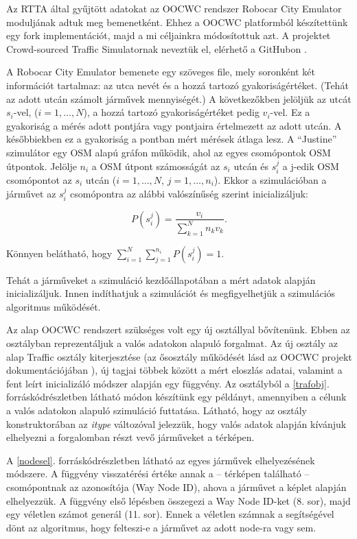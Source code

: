 \documentclass[a4paper,12pt]{report}
\begin{document}
Az RTTA által gyűjtött adatokat az OOCWC rendszer Robocar City Emulator moduljának adtuk meg bemenetként. Ehhez a OOCWC platformból készítettünk egy fork implementációt, majd a mi céljainkra módosítottuk azt. A projektet Crowd-sourced Traffic Simulatornak neveztük el, elérhető a GitHubon \cite{csts}.

A Robocar City Emulator bemenete egy szöveges file, mely soronként két információt tartalmaz: az utca nevét és a hozzá tartozó gyakoriságértéket. (Tehát az adott utcán számolt járművek mennyiségét.) A következőkben jelöljük az utcát $s_i$-vel, ($i=1, \dots, N$), a hozzá tartozó gyakoriságértéket pedig $v_i$-vel. Ez a gyakoriság a mérés adott pontjára vagy pontjaira értelmezett az adott utcán. A későbbiekben ez a gyakoriság a pontban mért mérések átlaga lesz. A ``Justine'' szimulátor egy OSM alapú gráfon működik, ahol az egyes csomópontok OSM útpontok. Jelölje $n_i$ a OSM útpont számosságát az $s_i$ utcán és $s_i^j$ a j-edik OSM csomópontot az $s_i$ utcán ($i=1, \dots, N$, $j=1, \dots, n_i$). Ekkor a szimulációban a járművet az $s_i^j$ csomópontra az alábbi valószínűség szerint inicializáljuk: 

\[P(s_i^j)=\frac{v_i}{\sum_{k=1}^{N}{n_kv_k}}.\]

Könnyen belátható, hogy $\sum_{i=1}^{N}\sum_{j=1}^{n_i}P(s_i^j) = 1$.

Tehát a járműveket a szimuláció kezdőállapotában a mért adatok alapján inicializáljuk. Innen indíthatjuk a szimulációt és megfigyelhetjük a szimulációs algoritmus működését.

Az alap OOCWC rendszert szükséges volt egy új osztállyal bővítenünk. Ebben az osztályban reprezentáljuk a valós adatokon alapuló forgalmat. Az új osztály az alap Traffic osztály kiterjesztése (az ősosztály működését lásd az OOCWC projekt dokumentációjában \cite{oocwcrepo}), új tagjai többek között a mért eloszlás adatai, valamint a fent leírt inicializáló módszer alapján egy függvény. Az osztályból a \ref{trafobj}. forráskódrészletben látható módon készítünk egy példányt, amennyiben a célunk a valós adatokon alapuló szimuláció futtatása. Látható, hogy az osztály konstruktorában az \emph{itype} változóval jelezzük, hogy valós adatok alapján kívánjuk elhelyezni a forgalomban részt vevő járműveket a térképen.



A \ref{nodesel}. forráskódrészletben látható az egyes járművek elhelyezésének módszere. A függvény visszatérési értéke annak a -- térképen található -- csomópontnak az azonosítója (Way Node ID), ahova a járművet a képlet alapján elhelyezzük. A függvény első lépésben összegezi a Way Node ID-ket (8. sor), majd egy véletlen számot generál (11. sor). Ennek a véletlen számnak a segítségével dönt az algoritmus, hogy felteszi-e a járművet az adott node-ra vagy sem.
\end{document}

